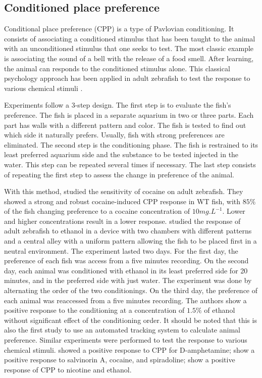     \subsection{Conditioned place preference}
    Conditional place preference (CPP) is a type of Pavlovian conditioning. It consists of associating a conditioned stimulus that has been taught to the animal with an unconditioned stimulus that one seeks to test. The most classic example is associating the sound of a bell with the release of a food smell. After learning, the animal can responds to the conditioned stimulus alone.
    This classical psychology approach has been applied in adult zebrafish to test the response to various chemical stimuli \cite{mathur2011conditioned}.

    Experiments follow a 3-step design.
    The first step is to evaluate the fish's preference. The fish is placed in a separate aquarium in two or three parts. Each part has walls with a different pattern and color. The fish is tested to find out which side it naturally prefers. Usually, fish with strong preferences are eliminated.
    The second step is the conditioning phase. The fish is restrained to its least preferred aquarium side and the substance to be tested injected in the water. This step can be repeated several times if necessary.
    The last step consists of repeating the first step to assess the change in preference of the animal.

    With this method, \cite{darland2001behavioral} studied the sensitivity of cocaine on adult zebrafish. They showed a strong and robust cocaine-induced CPP response in WT fish, with $85\%$ of the fish changing preference to a cocaine concentration of $10mg.L^{-1}$. Lower and higher concentrations result in a lower response.
    \cite{mathur2011preference} studied the response of adult zebrafish to ethanol in a device with two chambers with different patterns and a central alley with a uniform pattern allowing the fish to be placed first in a neutral environment. The experiment lasted two days. For the first day, the preference of each fish was access from a five minutes recording. On the second day, each animal was conditioned with ethanol in its least preferred side for 20 minutes, and in the preferred side with just water. The experiment was done by alternating the order of the two conditionings. On the third day, the preference of each animal was reaccessed from a five minutes recording. The authors show a positive response to the conditioning at a concentration of $1.5\%$ of ethanol without significant effect of the conditioning order. It should be noted that this is also the first study to use an automated tracking system to calculate animal preference.
    Similar experiments were performed to test the response to various chemical stimuli. \cite{ninkovic2006genetic, ninkovic2006zebrafish} showed a positive response to CPP for D-amphetamine; \cite{braida2007hallucinatory} show a positive response to salvinorin A, cocaine, and spiradoline; \cite{kedikian2013behavioral, } show a positive response of CPP to nicotine and ethanol.

